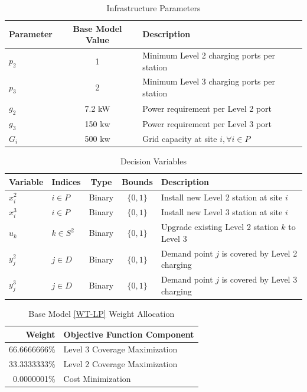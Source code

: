 \begin{table}[!htb]
    \caption{Infrastructure Parameters}
    \label{tab:infrastructure-parameters}
    \centering
    \begin{tabularx}{\textwidth}{l c X}
        \toprule Parameter & Base Model Value & Description \\
        \midrule
        $p_2$ & 1 & Minimum Level 2 charging ports per station \\
        $p_3$ & 2 & Minimum Level 3 charging ports per station \\
        $g_2$ & 7.2 kW & Power requirement per Level 2 port \\
        $g_3$ & 150 kw & Power requirement per Level 3 port \\
        $G_i$ & 500 kw & Grid capacity at site $i, \forall i \in P$ \\
        \bottomrule
    \end{tabularx}
\end{table}

\begin{table}[!htb]
    \caption{Decision Variables}
    \label{tab:decision-variables}
    \centering
    \begin{tabularx}{\textwidth}{l l c c X}
        \toprule
        Variable & Indices & Type & Bounds & Description \\
        \midrule
        $x^2_i$ & $i \in P$ & Binary & $\{0,1\}$ & Install new Level 2 station at site $i$ \\
        $x^3_i$ & $i \in P$ & Binary & $\{0,1\}$ & Install new Level 3 station at site $i$ \\
        $u_k$ & $k \in S^2$ & Binary & $\{0,1\}$ & Upgrade existing Level 2 station $k$ to Level 3 \\
        $y^2_j$ & $j \in D$ & Binary & $\{0,1\}$ & Demand point $j$ is covered by Level 2 charging \\
        $y^3_j$ & $j \in D$ & Binary & $\{0,1\}$ & Demand point $j$ is covered by Level 3 charging \\
        \bottomrule
    \end{tabularx}
\end{table}

\begin{table}[!htb]
    \caption{Base Model \eqref{WT-LP} Weight Allocation}
    \label{tab:obj-wt}
    \centering  
    \begin{tabularx}{\textwidth}{r X} 
        \toprule Weight & Objective Function Component \\
        \midrule
        66.6666666\% & Level 3 Coverage Maximization \\
        33.3333333\% & Level 2 Coverage Maximization \\
        0.0000001\% & Cost Minimization \\
        \bottomrule
    \end{tabularx}
\end{table}
